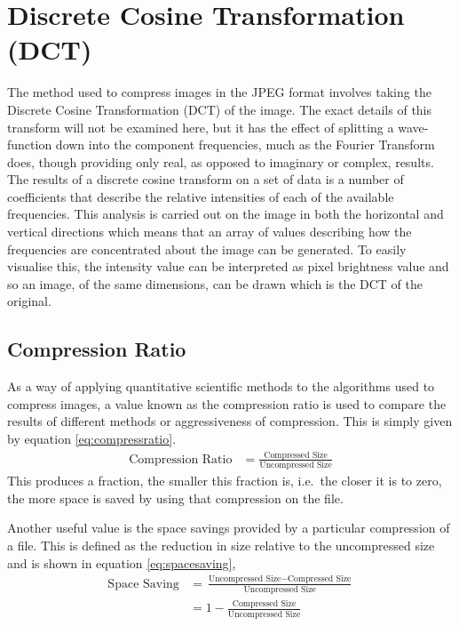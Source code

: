 \section{Discrete Cosine Transformation (DCT)} %
\label{sec:discrete_cosine_transformation_}
The method used to compress images in the JPEG format involves taking the Discrete Cosine Transformation (DCT) of the image. The exact details of this transform will not be examined here, but it has the effect of splitting a wave-function down into the component frequencies, much as the Fourier Transform does, though providing only real, as opposed to imaginary or complex, results. The results of a discrete cosine transform on a set of data is a number of coefficients that describe the relative intensities of each of the available frequencies. This analysis is carried out on the image in both the horizontal and vertical directions which means that an array of values describing how the frequencies are concentrated about the image can be generated. To easily visualise this, the intensity value can be interpreted as pixel brightness value and so an image, of the same dimensions, can be drawn which is the DCT of the original.

\subsection{Compression Ratio} %
\label{sub:compression_ratio}
As a way of applying quantitative scientific methods to the algorithms used to compress images, a value known as the compression ratio is used to compare the results of different methods or aggressiveness of compression. This is simply given by equation \ref{eq:compressratio}.
\begin{align}
	\text{Compression Ratio} &= \frac{\text{Compressed Size}}{\text{Uncompressed Size}} \label{eq:compressratio}
\end{align}
This produces a fraction, the smaller this fraction is, i.e.\ the closer it is to zero, the more space is saved by using that compression on the file.

Another useful value is the space savings provided by a particular compression of a file. This is defined as the reduction in size relative to the uncompressed size and is shown in equation \ref{eq:spacesaving},
\begin{align}
	\text{Space Saving} &= \frac{\text{Uncompressed Size} - \text{Compressed Size}}{\text{Uncompressed Size}} \\
	 &= 1- \frac{\text{Compressed Size}}{\text{Uncompressed Size}} \label{eq:spacesaving}
\end{align}

